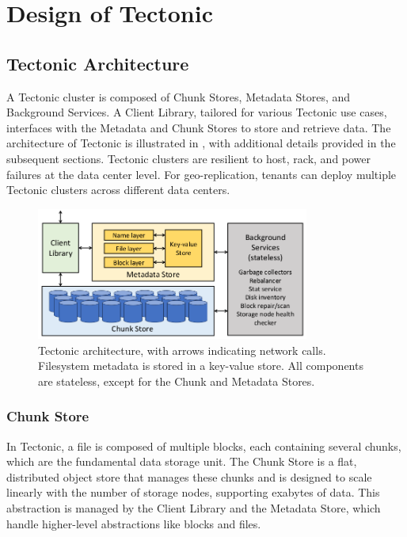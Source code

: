 \section{Design of Tectonic}

\subsection{Tectonic Architecture}\label{sec:tectonic_architecture}

A Tectonic cluster is composed of Chunk Stores, Metadata Stores, and Background Services. A Client Library, tailored for various Tectonic use cases, interfaces with the Metadata and Chunk Stores to store and retrieve data. The architecture of Tectonic is illustrated in , with additional details provided in the subsequent sections. Tectonic clusters are resilient to host, rack, and power failures at the data center level. For geo-replication, tenants can deploy multiple Tectonic clusters across different data centers.

\begin{figure}[htbp]
    \centering
    \includegraphics[width=0.8\textwidth]{pics/design.png}
    \caption{Tectonic architecture, with arrows indicating network calls. Filesystem metadata is stored in a key-value store. All components are stateless, except for the Chunk and Metadata Stores.}\label{fig:tectonic_architecture}
\end{figure}

\subsubsection{Chunk Store}\label{sec:chunk_store}
In Tectonic, a file is composed of multiple blocks, each containing several chunks, which are the fundamental data storage unit. The Chunk Store is a flat, distributed object store that manages these chunks and is designed to scale linearly with the number of storage nodes, supporting exabytes of data. This abstraction is managed by the Client Library and the Metadata Store, which handle higher-level abstractions like blocks and files.

